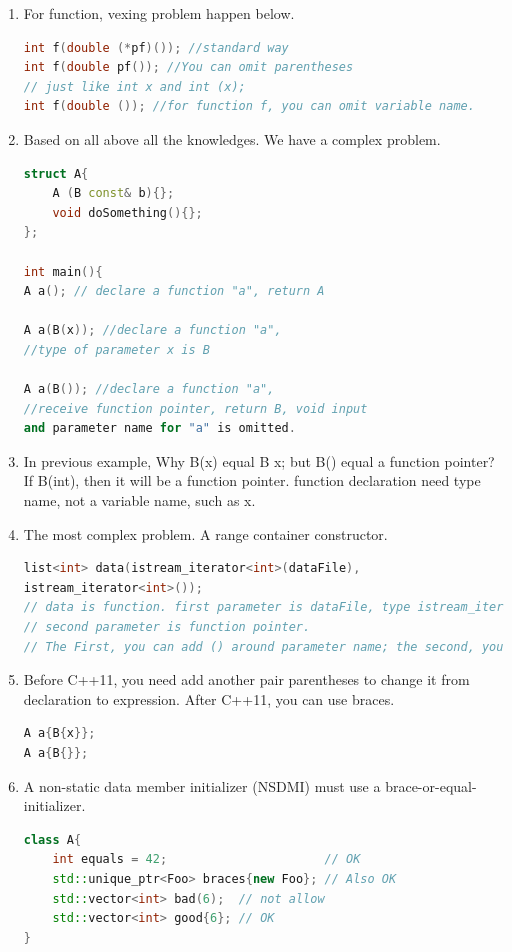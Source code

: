 \documentclass[a4paper,12pt,twoside]{book}
\begin{document}
\begin{enumerate}
	\item For function, vexing problem happen below.
\begin{lstlisting}[frame=single, language=c++, mathescape=true]
int f(double (*pf)()); //standard way
int f(double pf()); //You can omit parentheses
// just like int x and int (x);
int f(double ()); //for function f, you can omit variable name.                 
\end{lstlisting}
	
	\item Based on all above all the knowledges. We have a complex problem.
\begin{lstlisting}[frame=single, language=c++, mathescape=true]
struct A{
	A (B const& b){};
	void doSomething(){};
};
	
int main(){    
A a(); // declare a function "a", return A
	
A a(B(x)); //declare a function "a",   
//type of parameter x is B

A a(B()); //declare a function "a",
//receive function pointer, return B, void input
and parameter name for "a" is omitted.   
\end{lstlisting}
	
	\item In previous example, Why B(x) equal B x; but B() equal a function pointer? If B(int), then it will be a function pointer.  function declaration need type name, not a variable name, such as x.
	
	\item The most complex problem. A range container constructor. 
\begin{lstlisting}[frame=single, language=c++, mathescape=true]
list<int> data(istream_iterator<int>(dataFile), 
istream_iterator<int>()); 
// data is function. first parameter is dataFile, type istream_iterator<int>
// second parameter is function pointer. 
// The First, you can add () around parameter name; the second, you can omit parameter name
\end{lstlisting}
	
	\item Before C++11, you need add another pair parentheses to change it from declaration to expression. After C++11, you can use braces.
\begin{lstlisting}[frame=single, language=c++, mathescape=true]
A a{B{x}}; 
A a{B{}};
\end{lstlisting} 
	
	\item A non-static data member initializer (NSDMI) must use a brace-or-equal-initializer.
\begin{lstlisting}[frame=single, language=c++, mathescape=true]
class A{
	int equals = 42;                      // OK
	std::unique_ptr<Foo> braces{new Foo}; // Also OK
	std::vector<int> bad(6);  // not allow
	std::vector<int> good{6}; // OK  
}  
\end{lstlisting}
	

\end{enumerate}
\end{document}
